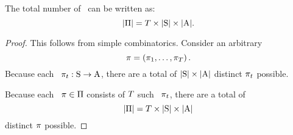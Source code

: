 \documentclass{rl_theory/proof}
\begin{document}
\begin{proposition}
  The total number of \strs\ can be written as:
  $$|\Pi| = T \times |{\rm S}| \times |{\rm A}|.$$%
\end{proposition}

\begin{proof}
  This follows from simple combinatorics.
  Consider an arbitrary \str
  $$\pi = \left(\pi_{1},\ldots,\pi_{T}\right).$$
  Because each \stpstr\ $\pi_t : {\rm S} \rightarrow {\rm A}$,
  there are a total of $|{\rm S}| \times |{\rm A}|$ distinct $\pi_t$ possible.

  Because each \str\ $\pi \in \Pi$ consists of $T$ such \stpstrs\ $\pi_t$,
  there are a total of 
  $$|\Pi| = T \times |{\rm S}| \times |{\rm A}|$$
  distinct $\pi$ possible.
\end{proof}
\end{document}
